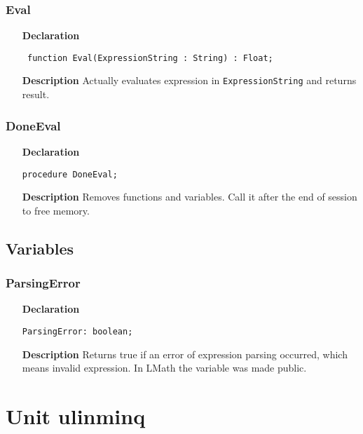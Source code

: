 \documentclass[12pt,a4paper,oneside]{report}
\newcommand{\lmath}[1]{   %
	\marginpar{\vspace{#1} 
		\begin{flushright}
			LMath
	\end{flushright} }
}
\newcommand{\declarationitem}[1]{\textbf{#1}}
\newcommand{\descriptiontitle}[1]{\textbf{#1}}
\newcommand{\code}[1]{\texttt{#1}}
\begin{document}
\subsubsection{Eval}
\label{ueval-Eval}
\begin{itemize}\item[\declarationitem{Declaration}\hfill]
	\begin{flushleft}
		\code{
			function Eval(ExpressionString : String) : Float;}
	\end{flushleft}
	\item[\descriptiontitle{Description}]
Actually evaluates expression in \code{ExpressionString} and returns result.
\end{itemize}
\subsubsection{DoneEval} \lmath{-6pt}
\label{ueval-DoneEval}
\begin{itemize}\item[\declarationitem{Declaration}\hfill]
	\begin{flushleft}
		\code{procedure DoneEval;}
	\end{flushleft}
	\item[\descriptiontitle{Description}]
	Removes functions and variables. Call it after the end of session to free memory.
\end{itemize}
\subsection{Variables}
\subsubsection{ParsingError}\lmath{-24pt}
\label{ueval-parsingerror}
\begin{itemize}
\item[\declarationitem{Declaration}\hfill]
\begin{flushleft}
	\code{ParsingError: boolean;}
\end{flushleft}
\item[\descriptiontitle{Description}] Returns true if an error of expression parsing occurred, which means invalid expression. In LMath the variable was made public.
\end{itemize}

\section{Unit ulinminq}
\label{ulinminq}
\end{document}
